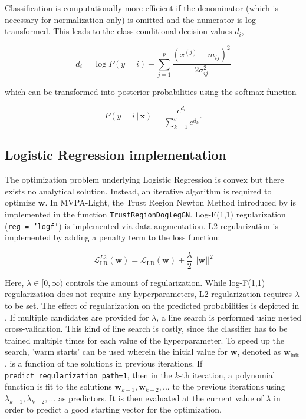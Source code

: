 \documentclass[utf8]{frontiersSCNS} %
\newcommand{\mf}[2]{m_{#1#2}}
\newcommand{\sig}[2]{\sigma_{#1#2}^2}
\newcommand{\w}{\mathbf{w}}
\newcommand{\x}{\mathbf{x}}
\newcommand{\xf}[1]{x^{(#1)}} %
\renewcommand{\L}{\mathcal{L}}
\newcommand{\ttt}[1]{\texttt{#1}}
\begin{document}
Classification is computationally more efficient if the denominator (which is necessary for normalization only) is omitted and the numerator is log transformed. This leads to the class-conditional decision values $d_i$,

\begin{equation}
\label{eq:naive_bayes_dval}
d_i = \log P(y = i) - \sum_{j=1}^p \frac{(\xf{j} - \mf{i}{j})^2}{2\sig{i}{j}}
\end{equation}

which can be transformed into posterior probabilities using the softmax function

\begin{equation}
\label{eq:naive_bayes_softmax}
P(y = i\,|\,\x) = \frac{e^{d_i}}{\sum_{k=1}^c e^{d_k}}.
\end{equation}

\subsection{Logistic Regression implementation}\label{sec:logreg_implementation}

The optimization problem underlying Logistic Regression is convex but there exists no analytical solution. Instead, an iterative algorithm is required to optimize $\w$. In MVPA-Light, the Trust Region Newton Method introduced by \cite{Lin2007TrustRegression} is implemented in the function \ttt{TrustRegionDoglegGN}. Log-F(1,1) regularization (\ttt{reg = 'logf'}) is implemented via data augmentation. L2-regularization is implemented by adding a penalty term to the loss function:

\begin{equation}
\label{eq:logreg_loss_function_plus_penalty}
\L_\text{LR}^{L2}(\w) = \L_\text{LR}(\w) + \frac{\lambda}{2}\, ||\w||^2
\end{equation}

Here, $\lambda\in [0,\infty)$ controls the amount of regularization. While log-F(1,1) regularization does not require any hyperparameters, L2-regularization requires $\lambda$ to be set. The effect of regularization on the predicted probabilities is depicted in . If multiple candidates are provided for $\lambda$, a line search is performed using nested cross-validation. This kind of line search is costly, since the classifier has to be trained multiple times for each value of the hyperparameter. To speed up the search, 'warm starts' can be used wherein the initial value for $\w$, denoted as  $\w_\text{init}$, is a function of the solutions in previous iterations. If \ttt{predict\_regularization\_path=1}, then in the $k$-th iteration, a polynomial function is fit to the solutions $\w_{k-1},\w_{k-2},...$ to the previous iterations  using $\lambda_{k-1}, \lambda_{k-2}, ...$ as predictors. It is then evaluated at the current value of $\lambda$ in order to predict a good starting vector for the optimization.
\end{document}
